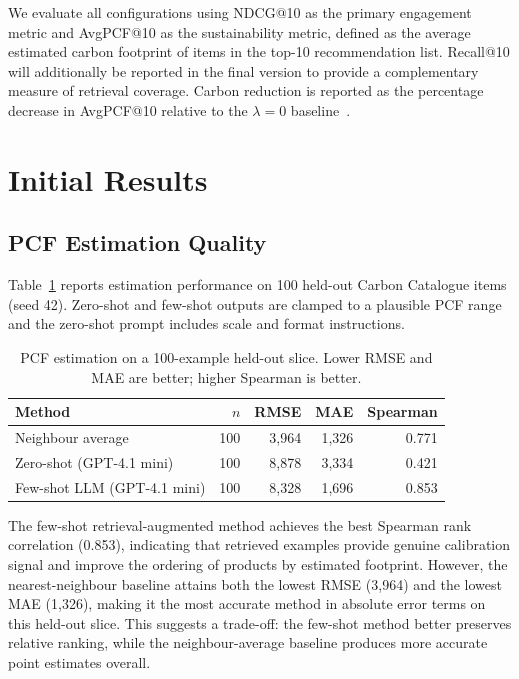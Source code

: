 \documentclass[11pt]{article}
\begin{document}
We evaluate all configurations using NDCG@10 as the primary engagement
metric and AvgPCF@10 as the sustainability metric, defined as the average
estimated carbon footprint of items in the top-10 recommendation list.
Recall@10 will additionally be reported in the final version to provide
a complementary measure of retrieval coverage. Carbon reduction is
reported as the percentage decrease in AvgPCF@10 relative to the
$\lambda = 0$ baseline~\cite{felfernig2025sustainability}.

\section{Initial Results}

\subsection{PCF Estimation Quality}

Table~\ref{tab:pcf} reports estimation performance on 100 held-out
Carbon Catalogue items (seed 42). Zero-shot and few-shot outputs are
clamped to a plausible PCF range and the zero-shot prompt includes scale
and format instructions.

\begin{table}[H]
\centering
\small
\begin{tabular}{lrrrr}
\toprule
Method & $n$ & RMSE & MAE & Spearman \\
\midrule
Neighbour average            & 100 & 3{,}964 & 1{,}326 & 0.771 \\
Zero-shot (GPT-4.1 mini)     & 100 & 8{,}878 & 3{,}334 & 0.421 \\
Few-shot LLM (GPT-4.1 mini) & 100 & 8{,}328 & 1{,}696 & 0.853 \\
\bottomrule
\end{tabular}
\caption{PCF estimation on a 100-example held-out slice. Lower RMSE and
MAE are better; higher Spearman is better.}
\label{tab:pcf}
\end{table}

The few-shot retrieval-augmented method achieves the best Spearman rank
correlation (0.853), indicating that retrieved examples provide genuine
calibration signal and improve the ordering of products by estimated
footprint. However, the nearest-neighbour baseline attains both the
lowest RMSE (3{,}964) and the lowest MAE (1{,}326), making it the most
accurate method in absolute error terms on this held-out slice. This
suggests a trade-off: the few-shot method better preserves relative
ranking, while the neighbour-average baseline produces more accurate
point estimates overall.
\end{document}
